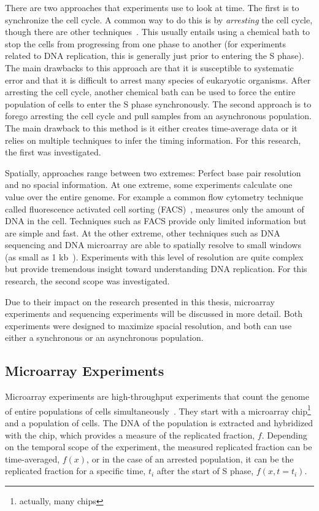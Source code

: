 	There are two approaches that experiments use to look at time.
	The first is to synchronize the cell cycle.
	A common way to do this is by \emph{arresting} the cell cycle, though there are other techniques~\cite{CellCycleSynch}.
	This usually entails using a chemical bath to stop the cells from progressing from one phase to another (for experiments related to DNA replication, this is generally just prior to entering the S phase).
	The main drawbacks to this approach are that it is susceptible to systematic error and that it is difficult to arrest many species of eukaryotic organisms.
	After arresting the cell cycle, another chemical bath can be used to force the entire population of cells to enter the S phase synchronously.
	The second approach is to forego arresting the cell cycle and pull samples from an asynchronous population.
	The main drawback to this method is it either creates time-average data or it relies on multiple techniques to infer the timing information.
	For this research, the first was investigated.
	
	Spatially, approaches range between two extremes: Perfect base pair resolution and no spacial information.
	At one extreme, some experiments calculate one value over the entire genome. 
	For example a common flow cytometry technique called fluorescence activated cell sorting (FACS)~\cite{SequencingReview, DeepSeq}, measures only the amount of DNA in the cell.
	Techniques such as FACS provide only limited information but are simple and fast.
	At the other extreme, other techniques such as DNA sequencing and DNA microarray are able to spatially resolve to small windows (as small as 1 kb~\cite{DeepSeq}).
	Experiments with this level of resolution are quite complex but provide tremendous insight toward understanding DNA replication.
	For this research, the second scope was investigated.
	
	Due to their impact on the research presented in this thesis, microarray experiments and sequencing experiments will be discussed in more detail.
	Both experiments were designed to maximize spacial resolution, and both can use either a synchronous or an asynchronous population.
	
	
		\subsection{Microarray Experiments}
		\label{subsec:Microarray}
		
		Microarray experiments are high-throughput experiments that count the genome of entire populations of cells simultaneously~\cite{MicroarrayReview}.
		They start with a microarray chip\footnote{actually, many chips} and a population of cells.
		The DNA of the population is extracted and hybridized with the chip, which provides a measure of the replicated fraction, $f$.
		Depending on the temporal scope of the experiment, the measured replicated fraction can be time-averaged, $f(x)$, or in the case of an arrested population, it can be the replicated fraction for a specific time, $t_i$ after the start of S phase, $f(x,t=t_i)$.
		
